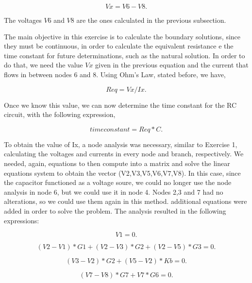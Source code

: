\begin{equation}
  Vx = V6 - V8.
  \label{eq:v_2}
\end{equation}

The voltages $V6$ and $V8$ are the ones calculated in the previous subsection.

The main objective in this exercise is to calculate the boundary solutions, since they must be continuous, in order to calculate the equivalent resistance e the time constant for future determinations, such as the natural solution. In order to do that, we need the value $Vx$ given in the previous equation and the current that flows in between nodes 6 and 8. Using Ohm's Law, stated before, we have,

\begin{equation}
  Req = Vx/Ix.
  \label{eq:req}
\end{equation}

Once we know this value, we can now determine the time constant for the RC circuit, with the following expression,

\begin{equation}
  time constant = Req*C.
  \label{eq:tc}
\end{equation}

To obtain the value of Ix, a node analysis was necessary, similar to Exercise 1, calculating the voltages and currents in every node and branch, respectively. We needed, again, equations to then compute into a matrix and solve the linear equations system to obtain the vector (V2,V3,V5,V6,V7,V8). In this case, since the capacitor functioned as a voltage soure, we could no longer use the node analysis in node 6, but we could use it in node 4. Nodes 2,3 and 7 had no alterations, so we could use them again in this method. additional equations were added in order to solve the problem. The analysis resulted in the following expressions:


\begin{equation}
  V1 = 0.
  \label{eq:n12}
\end{equation}

\begin{equation}
  (V2 - V1)*G1 + (V2 - V3)*G2 + (V2 - V5)*G3 = 0.
  \label{eq:n22}
\end{equation}

\begin{equation}
  (V3 - V2)*G2	+ (V5 - V2)*Kb = 0.
  \label{eq:n32}
\end{equation}

\begin{equation}
  (V7 - V8)*G7 + V7*G6 = 0.
  \label{eq:n42}
\end{equation}

